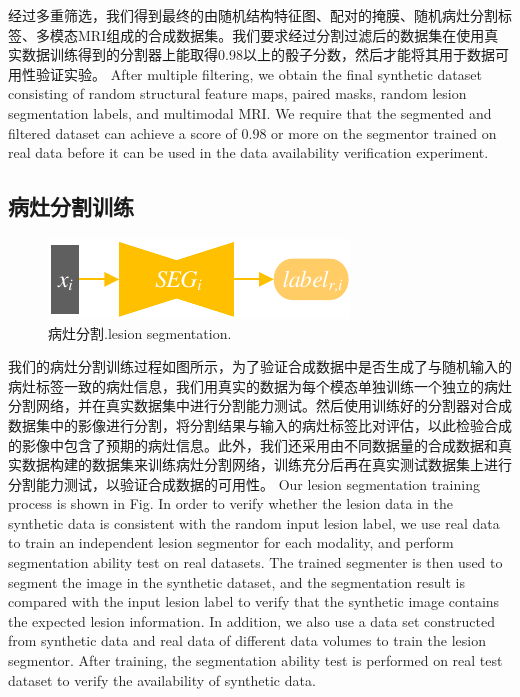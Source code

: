 \documentclass[letterpaper]{article} %
\begin{document}
经过多重筛选，我们得到最终的由随机结构特征图、配对的掩膜、随机病灶分割标签、多模态MRI组成的合成数据集。我们要求经过分割过滤后的数据集在使用真实数据训练得到的分割器上能取得0.98以上的骰子分数，然后才能将其用于数据可用性验证实验。
After multiple filtering, we obtain the final synthetic dataset consisting of random structural feature maps, paired masks, random lesion segmentation labels, and multimodal MRI. We require that the segmented and filtered dataset can achieve a score of 0.98 or more on the segmentor trained on real data before it can be used in the data availability verification experiment.

\subsection{病灶分割训练}
\begin{figure}
	\centering
	\includegraphics[width=0.45\columnwidth]{figures/segmentation}
	\caption{病灶分割.lesion segmentation.}
	\label{segmentation}
\end{figure}

我们的病灶分割训练过程如图所示，为了验证合成数据中是否生成了与随机输入的病灶标签一致的病灶信息，我们用真实的数据为每个模态单独训练一个独立的病灶分割网络，并在真实数据集中进行分割能力测试。然后使用训练好的分割器对合成数据集中的影像进行分割，将分割结果与输入的病灶标签比对评估，以此检验合成的影像中包含了预期的病灶信息。此外，我们还采用由不同数据量的合成数据和真实数据构建的数据集来训练病灶分割网络，训练充分后再在真实测试数据集上进行分割能力测试，以验证合成数据的可用性。
Our lesion segmentation training process is shown in Fig. In order to verify whether the lesion data in the synthetic data is consistent with the random input lesion label, we use real data to train an independent lesion segmentor for each modality, and perform segmentation ability test on real datasets. The trained segmenter is then used to segment the image in the synthetic dataset, and the segmentation result is compared with the input lesion label to verify that the synthetic image contains the expected lesion information. In addition, we also use a data set constructed from synthetic data and real data of different data volumes to train the lesion segmentor. After training, the segmentation ability test is performed on real test dataset to verify the availability of  synthetic data.
\end{document}
